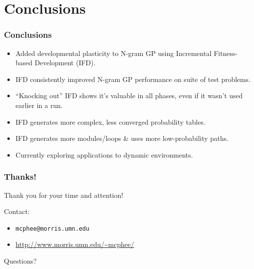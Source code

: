 \documentclass{beamer}
\newcommand{\linespace}{\vskip 0.25cm}
\begin{document}
\section[Conclusions]{Conclusions}

\begin{frame}
\frametitle{Conclusions}

\begin{itemize}
  \item Added developmental plasticity to N-gram GP using Incremental Fitness-based Development (IFD).
\end{itemize}

\begin{itemize}
  \item IFD consistently improved N-gram GP performance on suite of test problems.
  
  \linespace
  
  \item ``Knocking out'' IFD shows it's valuable in all phases, even if it wasn't used earlier in a run.

  \linespace
  
  \item IFD generates more complex, less converged probability tables.
  \item IFD generates more modules/loops \& uses more low-probability paths.
\end{itemize}

\begin{itemize}
  \item Currently exploring applications to dynamic environments.
\end{itemize}

\end{frame}

\begin{frame}
\frametitle{Thanks!}

Thank you for your time and attention!
	
\linespace
\linespace

Contact:  
\begin{itemize}
	\item \texttt{mcphee@morris.umn.edu}
	\item \url{http://www.morris.umn.edu/~mcphee/}
\end{itemize}

\linespace
\linespace

\begin{center}
{\huge Questions?}
\end{center}
\end{frame}
\end{document}
